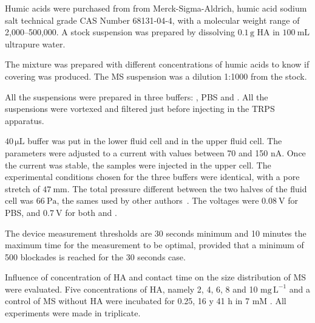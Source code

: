 \documentclass[journal=langd5,manuscript=article]{achemso}
\begin{document}
Humic acids were purchased from from Merck-Sigma-Aldrich,
humic acid sodium salt technical grade CAS Number 68131-04-4,
with a molecular weight range of 2,000--500,000.
 A stock suspension was prepared by dissolving 
$\mathrm{0.1\,g}$ HA in $100~\mathrm{mL}$ ultrapure water.

The mixture was prepared with different concentrations of humic acids to know if covering was produced. The MS suspension was a dilution 1:1000 from the stock. 





All the suspensions were prepared in three buffers: ,
PBS and . 
All the suspensions were vortexed 
and filtered just before injecting in the TRPS apparatus.

$\mathrm{40 \,\mu L}$ buffer
was put in the lower
fluid cell and in the upper fluid cell. The parameters were
adjusted to a current with values between 70 and 150 nA. Once
the current was stable, the samples were injected in the upper cell.
The experimental conditions chosen for the three buffers  were identical, with a pore stretch of $47~\mathrm{mm}$.
The total pressure different between the two halves of the fluid cell was 
$66~\mathrm{Pa}$, 
the sames used by other authors~\cite{Weatherall2016}.
The voltages were 
$0.08~\mathrm{V}$ for PBS, and 
$0.7~\mathrm{V}$ for both
 and
. 


		



The device measurement thresholds are 30 seconds minimum
and 10 minutes the maximum time for the measurement to be
optimal, provided that a minimum of 500 blockades is reached
for the 30 seconds case.




Influence of concentration of HA and contact time on the size  distribution of MS were evaluated.
Five concentrations of HA, namely 
2, 4, 6, 8 and  10 $\mathrm{mg\,L^{-1}}$
and a control of MS without HA
were incubated for 
0.25, 16 y 41 h in 
7 mM
.
All experiments were made in triplicate.
\end{document}
